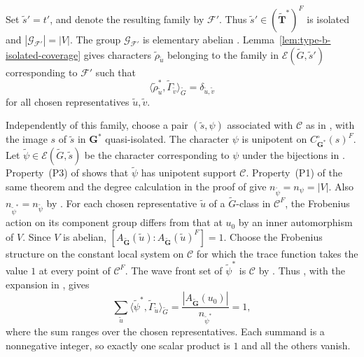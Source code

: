 \documentclass[10pt]{amsart}
\theoremstyle{definition}
\let\oldendproof\endproof
\renewenvironment{proof}[1][\proofname]{%
  \oldproof[\bfseries #1]%
}{\oldendproof}
\numberwithin{equation}{section}
\numberwithin{table}{section}
\begin{document}
\begin{proof}
Set $\widetilde s'=t'$, and denote the resulting family by $\mathcal F'$.
Thus $\widetilde s'\in(\widetilde{\mathbf T}^*)^F$ is isolated and
$|\mathcal G_{\mathcal F'}|=|V|$. The group $\mathcal G_{\mathcal F'}$
is elementary abelian \cite[Remark~4.2.17]{GeckMalle2020}.
Lemma~\ref{lem:type-b-isolated-coverage} gives characters
$\widetilde\rho_{\widetilde u}$ belonging to the family in
$\mathcal E(\widetilde G,\widetilde s')$ corresponding to $\mathcal F'$
such that
\[
 \langle\widetilde\rho_{\widetilde u}^{*},
       \widetilde\Gamma_{\widetilde v}\rangle_{\widetilde G}
 =\delta_{\widetilde u,\widetilde v}
\]
for all chosen representatives $\widetilde u,\widetilde v$.

Independently of this family, choose a pair $(\widetilde s,\psi)$
associated with $\mathcal C$ as in \cite[Theorem~3.2]{Taylor2013},
with the image $s$ of $\widetilde s$ in $\mathbf G^*$ quasi-isolated.
The character $\psi$ is unipotent on $C^\circ_{\mathbf G^*}(s)^F$.
Let $\widetilde\psi\in\mathcal E(\widetilde G,\widetilde s)$ be the
character corresponding to $\psi$ under the bijections in
\cite[(3.2)]{Taylor2013}.
Property~(P3) of \cite[Theorem~3.2]{Taylor2013} shows that
$\widetilde\psi$ has unipotent support $\mathcal C$.
Property~(P1) of the same theorem and the degree calculation in the
proof of \cite[Theorem~3.1]{Taylor2013} give
$n_{\widetilde\psi}=n_\psi=|V|$.
Also $n_{\widetilde\psi^*}=n_{\widetilde\psi}$ by
\cite[Proposition~3.4.21]{GeckMalle2020}.
For each chosen representative $\widetilde u$ of a $\widetilde G$-class
in $\mathcal C^F$, the Frobenius action on its component group differs
from that at $u_0$ by an inner automorphism of $V$. Since $V$ is abelian,
$[A_{\widetilde{\mathbf G}}(\widetilde u):
A_{\widetilde{\mathbf G}}(\widetilde u)^F]=1$.
Choose the Frobenius structure on the constant local system on
$\mathcal C$ for which the trace function takes the value $1$ at every
point of $\mathcal C^F$.
The wave front set
of $\widetilde\psi^*$ is $\mathcal C$ by \cite[Lemma~14.15]{Taylor2016}.
Thus \cite[Proposition~15.4]{Taylor2016}, with the expansion in
\cite[(11.15)]{Taylor2016}, gives
\[
 \sum_{\widetilde u}
 \langle\widetilde\psi^*,\widetilde\Gamma_{\widetilde u}
 \rangle_{\widetilde G}
 =\frac{|A_{\widetilde{\mathbf G}}(u_0)|}{n_{\widetilde\psi^*}}=1,
\]
where the sum ranges over the chosen representatives.
Each summand is a nonnegative integer, so exactly one scalar product
is $1$ and all the others vanish.


\end{proof}
\end{document}
